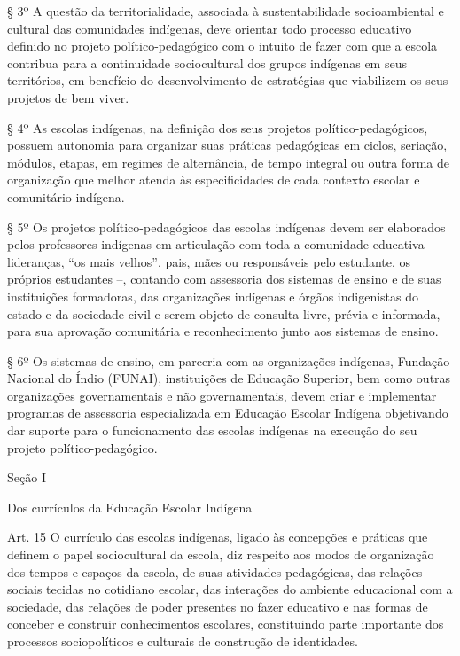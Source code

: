 \documentclass[
]{book}
\begin{document}
§ 3º A questão da territorialidade, associada à sustentabilidade socioambiental e cultural das comunidades indígenas, deve orientar todo processo educativo definido no projeto político-pedagógico com o intuito de fazer com que a escola contribua para a continuidade sociocultural dos grupos indígenas em seus territórios, em benefício do desenvolvimento de estratégias que viabilizem os seus projetos de bem viver.

§ 4º As escolas indígenas, na definição dos seus projetos político-pedagógicos, possuem autonomia para organizar suas práticas pedagógicas em ciclos, seriação, módulos, etapas, em regimes de alternância, de tempo integral ou outra forma de organização que melhor atenda às especificidades de cada contexto escolar e comunitário indígena.

§ 5º Os projetos político-pedagógicos das escolas indígenas devem ser elaborados pelos professores indígenas em articulação com toda a comunidade educativa -- lideranças, ``os mais velhos'', pais, mães ou responsáveis pelo estudante, os próprios estudantes --, contando com assessoria dos sistemas de ensino e de suas instituições formadoras, das organizações indígenas e órgãos indigenistas do estado e da sociedade civil e serem objeto de consulta livre, prévia e informada, para sua aprovação comunitária e reconhecimento junto aos sistemas de ensino.

§ 6º Os sistemas de ensino, em parceria com as organizações indígenas, Fundação Nacional do Índio (FUNAI), instituições de Educação Superior, bem como outras organizações governamentais e não governamentais, devem criar e implementar programas de assessoria especializada em Educação Escolar Indígena objetivando dar suporte para o funcionamento das escolas indígenas na execução do seu projeto político-pedagógico.

Seção I

Dos currículos da Educação Escolar Indígena

Art. 15 O currículo das escolas indígenas, ligado às concepções e práticas que definem o papel sociocultural da escola, diz respeito aos modos de organização dos tempos e espaços da escola, de suas atividades pedagógicas, das relações sociais tecidas no cotidiano escolar, das interações do ambiente educacional com a sociedade, das relações de poder presentes no fazer educativo e nas formas de conceber e construir conhecimentos escolares, constituindo parte importante dos processos sociopolíticos e culturais de construção de identidades.
\end{document}
